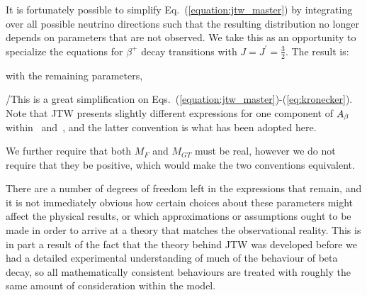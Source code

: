 It is fortunately possible to simplify Eq.~(\ref{equation:jtw_master}) by integrating over all possible neutrino directions %
such that the resulting distribution no longer depends on parameters that are not observed.  
%
We take this as an opportunity to specialize the equations for $\beta^+$ decay transitions with $J = J^\prime = \frac{3}{2}$. The result 
is:

\unskip with the remaining parameters,

\unskip \!\!/This is a great simplification on Eqs.~(\ref{equation:jtw_master})-(\ref{eq:kronecker}).  
Note that JTW presents slightly different expressions for one component of $A_{\beta}$ within~\cite{jtw} and~\cite{jtw_coulomb}, and the latter convention is what has been adopted here.  

We further require that both $M_F$ and $M_{GT}$ must be real, 
however we do not require that they be positive, which would make the two conventions equivalent.  

There are a number of degrees of freedom left in the expressions that remain, and it is not immediately obvious how certain choices about these parameters might affect the physical results, or which approximations or assumptions ought to be made in order to arrive at a theory that matches the observational reality.  This is in part a result of the fact that the theory behind \ac{JTW} was developed before we had a detailed experimental understanding of much of the behaviour of beta decay, so all mathematically consistent behaviours are treated with roughly the same amount of consideration within the model.  

